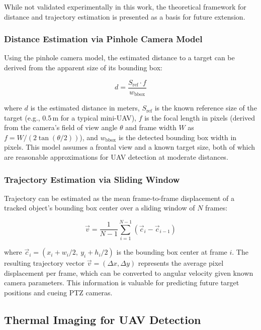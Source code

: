 \documentclass[12pt,a4paper]{report}
\begin{document}
While not validated experimentally in this work, the theoretical framework for
distance and trajectory estimation is presented as a basis for future extension.

\subsubsection{Distance Estimation via Pinhole Camera Model}

Using the pinhole camera model, the estimated distance to a target can be derived
from the apparent size of its bounding box:

\begin{equation}
  d = \frac{S_{\text{ref}} \cdot f}{w_{\text{bbox}}}
\end{equation}

where $d$ is the estimated distance in meters, $S_{\text{ref}}$ is the known
reference size of the target (e.g., 0.5\,m for a typical mini-UAV), $f$ is the
focal length in pixels (derived from the camera's field of view angle $\theta$
and frame width $W$ as $f = W / (2 \tan(\theta/2))$), and $w_{\text{bbox}}$ is
the detected bounding box width in pixels. This model assumes a frontal view and
a known target size, both of which are reasonable approximations for UAV detection
at moderate distances.

\subsubsection{Trajectory Estimation via Sliding Window}

Trajectory can be estimated as the mean frame-to-frame displacement of a tracked
object's bounding box center over a sliding window of $N$ frames:

\begin{equation}
  \vec{v} = \frac{1}{N-1} \sum_{i=1}^{N-1} \left( \vec{c}_{i} - \vec{c}_{i-1} \right)
\end{equation}

where $\vec{c}_i = (x_i + w_i/2,\ y_i + h_i/2)$ is the bounding box center at
frame $i$. The resulting trajectory vector $\vec{v} = (\Delta x, \Delta y)$
represents the average pixel displacement per frame, which can be converted to
angular velocity given known camera parameters. This information is valuable for
predicting future target positions and cueing PTZ cameras.

\subsection{Thermal Imaging for UAV Detection}
\end{document}
